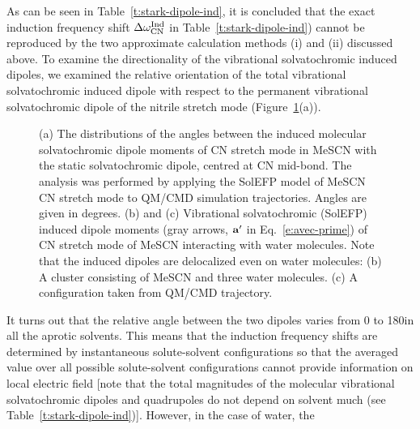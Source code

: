 \documentclass[a4paper,titlepage,twoside,fleqn,12pt]{book}
\begin{document}
\begin{refsection}
As can be seen in Table~\ref{t:stark-dipole-ind}, it is concluded that the exact
induction frequency shift $\Delta\omega_{\rm CN}^{\rm Ind}$ 
in Table~\ref{t:stark-dipole-ind}) cannot be
reproduced by the two approximate calculation methods (i)
and (ii) discussed above. To examine the directionality of the
vibrational solvatochromic induced dipoles, we examined the
relative orientation of the total vibrational solvatochromic
induced dipole with respect to the permanent vibrational
solvatochromic dipole of the nitrile stretch mode (Figure~\ref{f:solv-dip-directionality}(a)). 
%
\begin{figure}[t!]
\centering
\setlength\fboxsep{0.4pt}
\setlength\fboxrule{0.5pt}
\caption{
(a) The distributions of the angles between the induced molecular solvatochromic
dipole moments of CN stretch mode in MeSCN with the static solvatochromic dipole,
centred at CN mid\hyp{}bond. The analysis was performed by applying the SolEFP model of
MeSCN CN stretch mode to QM/CMD simulation trajectories. Angles are given in degrees.
(b) and (c) Vibrational solvatochromic (SolEFP) induced dipole moments 
(gray arrows, ${\bf a}'$ in Eq.~\eqref{e:avec-prime}) of CN stretch
mode of MeSCN interacting with water molecules. Note that the induced dipoles are delocalized even on
water molecules: (b) A cluster consisting of MeSCN and three water molecules. (c) A configuration taken
from QM/CMD trajectory.
\label{f:solv-dip-directionality}}
\end{figure}
%
It turns out that the relative angle between the two
dipoles varies from 0 to 180\textdegree in all the aprotic solvents. This
means that the induction frequency shifts are determined by
instantaneous solute\hyp{}solvent configurations so that the
averaged value over all possible solute\hyp{}solvent configurations
cannot provide information on local electric field [note that
the total magnitudes of the molecular vibrational
solvatochromic dipoles and quadrupoles do not depend on
solvent much (see Table~\ref{t:stark-dipole-ind})]. However, in the case of water, the

\end{refsection}
\end{document}
